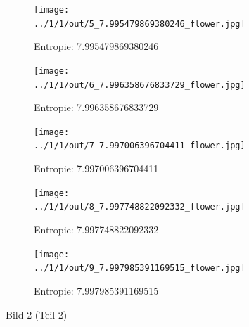 \begin{figure}
	\centering

	\begin{subfigure}{0.25\textwidth}
		\texttt{[image: ../1/1/out/5\_7.995479869380246\_flower.jpg]}
		\caption{Entropie: 7.995479869380246}
	\end{subfigure}

	\begin{subfigure}{0.25\textwidth}
		\texttt{[image: ../1/1/out/6\_7.996358676833729\_flower.jpg]}
		\caption{Entropie: 7.996358676833729}
	\end{subfigure}

	\begin{subfigure}{0.25\textwidth}
		\texttt{[image: ../1/1/out/7\_7.997006396704411\_flower.jpg]}
		\caption{Entropie: 7.997006396704411}
	\end{subfigure}

	\begin{subfigure}{0.25\textwidth}
		\texttt{[image: ../1/1/out/8\_7.997748822092332\_flower.jpg]}
		\caption{Entropie: 7.997748822092332}
	\end{subfigure}

	\begin{subfigure}{0.25\textwidth}
		\texttt{[image: ../1/1/out/9\_7.997985391169515\_flower.jpg]}
		\caption{Entropie: 7.997985391169515}
	\end{subfigure}

	\caption{Bild 2 (Teil 2)}
\end{figure}

